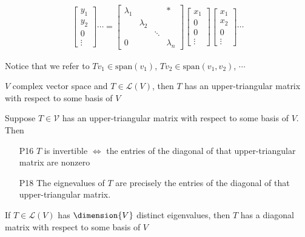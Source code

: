 \begin{description}
\begin{itemize}
\begin{align*}
\begin{bmatrix}
y_1\\
y_2 \\
0 \\
\vdots
\end{bmatrix}
\cdots =
\begin{bmatrix}
\lambda_1 &  & & * \\
  & \lambda_2  & \\
  &  & \ddots & \\
0 & &        & \lambda_n
\end{bmatrix}
\begin{bmatrix}
x_1\\
0 \\
0 \\
\vdots
\end{bmatrix}
\begin{bmatrix}
x_1\\
x_2 \\
0 \\
\vdots
\end{bmatrix}
\cdots
\end{align*}
\end{itemize}
Notice that we refer to $Tv_1 \in \mathrm{span}(v_1)$, $Tv_2 \in \mathrm{span}(v_1, v_2)$, $\cdots$

\item[T13] $V$ complex vector space and $T\in\mathcal{L}(V)$, then $T$ has an upper-triangular matrix with respect to some basis of $V$

\item Suppose $T\in\mathcal{V}$ has an upper-triangular matrix with respect to some basis of $V$. Then
\begin{itemize}
 \item[P16] $T$ is invertible $\iff$ the entries of the diagonal of that upper-triangular matrix are nonzero
 \item[P18] The eignevalues of $T$ are precisely the entries of the diagonal of that upper-triangular matrix.
\end{itemize}

\item[P20] If $T\in\mathcal{L}(V)$ has $\dimension{V}$ distinct eigenvalues, then $T$ has a diagonal matrix with respect to some basis of $V$


\end{description}
